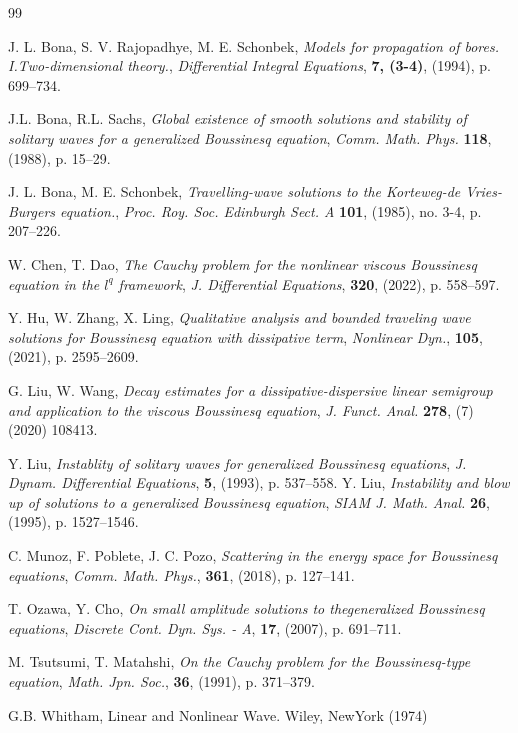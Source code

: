 \documentclass[12pt]{amsart}
\theoremstyle{definition}
\theoremstyle{remark}
\numberwithin{equation}{section}
\renewcommand{\(}{\left(}
\renewcommand{\)}{\right)}
\renewcommand{\[}{\left[}
\renewcommand{\]}{\right]}
\begin{document}
\begin{thebibliography}{99}
	
	
	
 J. L. Bona, S. V. Rajopadhye, M. E. Schonbek, \emph{ Models for propagation of bores. I.Two-dimensional theory.}, {\em  Differential Integral Equations}, {\bf  7, (3-4)}, (1994),  p. 699--734. 

  J.L. Bona, R.L. Sachs, \emph{Global existence of smooth solutions and stability of solitary waves for a generalized Boussinesq equation}, {\em Comm. Math. Phys.} {\bf  118}, 
 (1988), p. 15--29.

 J. L. Bona,  M. E. Schonbek, \emph{ Travelling-wave solutions to the Korteweg-de Vries-Burgers equation.}, {\em  Proc. Roy. Soc. Edinburgh Sect. A} {\bf 101},  (1985), no. 3-4,  p. 207--226. 
	
 W. 	Chen,  T. Dao, \emph{
	The Cauchy problem for the nonlinear viscous Boussinesq equation in the $l^q$ framework}, 
	{\em J. Differential Equations}, {\bf  320},  (2022), p. 558--597.
	
	   Y. Hu, W. Zhang, X. Ling, \emph{Qualitative analysis and bounded traveling wave solutions for Boussinesq equation with dissipative term}, {\em Nonlinear Dyn.}, {\bf 105}, (2021),  p. 2595--2609. 
	
	
	
 	G. Liu, W. Wang, \emph{Decay estimates for a dissipative-dispersive linear semigroup and application to the viscous Boussinesq equation}, {\em J. Funct. Anal.} {\bf  278}, (7) (2020) 108413.

 Y. Liu, \emph{Instablity of solitary waves for generalized Boussinesq equations}, {\em J. Dynam. Differential Equations}, {\bf  5},  (1993), p. 537--558.
 Y. Liu, \emph{Instability and blow up of solutions to a generalized Boussinesq equation}, {\em SIAM J. Math. Anal.} {\bf  26},  (1995), p. 1527--1546.

 C. Munoz, F. Poblete,  J. C. Pozo, \emph{ Scattering in the energy space for Boussinesq equations}, {\em Comm. Math. Phys.}, {\bf  361}, (2018), p. 127--141. 

 T. Ozawa,  Y. Cho, \emph{On small amplitude solutions to thegeneralized Boussinesq equations},  {\em Discrete Cont. Dyn. Sys. - A}, {\bf 17}, (2007), p. 691--711. 


 M. Tsutsumi,  T. Matahshi,  \emph{On the Cauchy problem for the Boussinesq-type equation}, {\em Math. Jpn. Soc.}, {\bf 36}, (1991), p. 371--379. 

 G.B. Whitham, Linear and Nonlinear Wave. Wiley, NewYork (1974)



 
 
	
 

\end{thebibliography}
\end{document}
